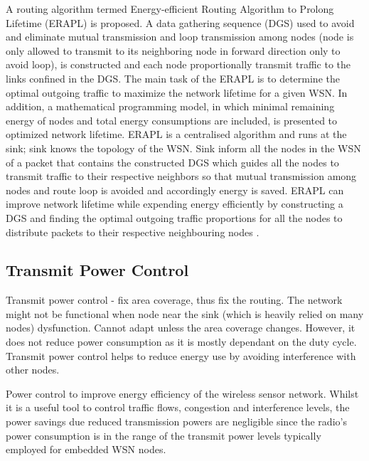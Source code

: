 A routing algorithm termed Energy-efficient Routing Algorithm to Prolong Lifetime (ERAPL) is proposed. A data gathering sequence (DGS) used to avoid and eliminate mutual transmission and loop transmission among nodes (node is only allowed to transmit to its neighboring node in forward direction only to avoid loop), is constructed and each node proportionally transmit traffic to the links confined in the DGS. The main task of the ERAPL is to determine the optimal outgoing traffic to maximize the network lifetime for a given WSN. In addition, a mathematical programming model, in which minimal remaining energy of nodes and total energy consumptions are included, is presented to optimized network lifetime. ERAPL is a centralised algorithm and runs at the sink; sink knows the topology of the WSN. Sink inform all the nodes in the WSN of a packet that contains the constructed DGS which guides all the nodes to transmit traffic to their respective neighbors so that mutual transmission among nodes and route loop is avoided and accordingly energy is saved. ERAPL can improve network lifetime while expending energy efficiently by constructing a DGS and finding the optimal outgoing traffic proportions for all the nodes to distribute packets to their respective neighbouring nodes \cite{erapl}. 

\subsection{Transmit Power Control}
Transmit power control - fix area coverage, thus fix the routing. The network might not be functional when node near the sink (which is heavily relied on many nodes) dysfunction. Cannot adapt unless the area coverage changes. However, it does not reduce power consumption as it is mostly dependant on the duty cycle. Transmit power control helps to reduce energy use by avoiding interference with other nodes.

Power control to improve energy efficiency of the wireless sensor network. Whilst it is a useful tool to control traffic flows, congestion and interference levels, the power savings due reduced transmission powers are negligible since the radio's power consumption is in the range of the transmit power levels typically employed for embedded WSN nodes. \cite{macsurvey}

